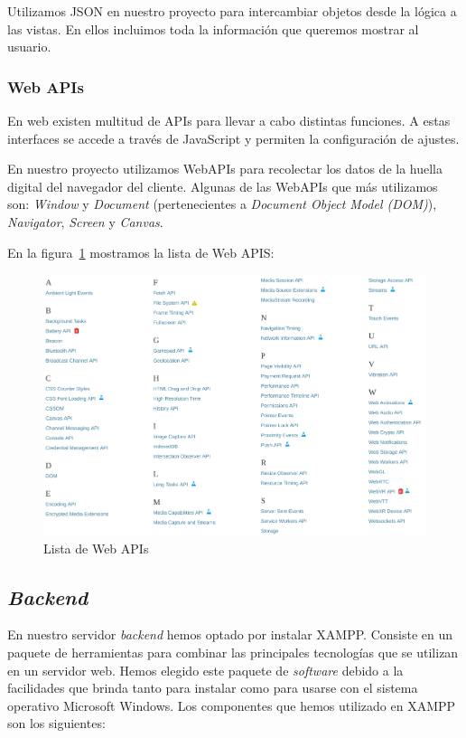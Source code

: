Utilizamos JSON en nuestro proyecto para intercambiar objetos desde la lógica a las vistas. En ellos incluimos toda la información que queremos mostrar al usuario. \par

\subsubsection{Web APIs}
En web existen multitud de APIs para llevar a cabo distintas funciones. A estas interfaces se accede a través de JavaScript y permiten la configuración de ajustes. \par

En nuestro proyecto utilizamos WebAPIs para recolectar los datos de la huella digital del navegador del cliente. Algunas de las WebAPIs que más utilizamos son: \textit{Window} y \textit{Document} (pertenecientes a \textit{Document Object Model (DOM)}), \textit{Navigator}, \textit{Screen} y \textit{Canvas}. \par 

En la figura~\ref{fig:webAPIs} mostramos la lista de Web APIS: \par 

\begin{figure}[H]
	\centering
	\includegraphics[width=1\textwidth]{Images/webapis.png}
	\caption{Lista de Web APIs}
	\label{fig:webAPIs}
\end{figure}


\subsection{\textit{Backend}}

En nuestro servidor \textit{backend} hemos optado por instalar XAMPP. Consiste en un paquete de herramientas para combinar las principales tecnologías que se utilizan en un servidor web. Hemos elegido este paquete de \textit{software} debido a la facilidades que brinda tanto para instalar como para usarse con el sistema operativo Microsoft Windows. Los componentes que hemos utilizado en XAMPP son los siguientes: \par

